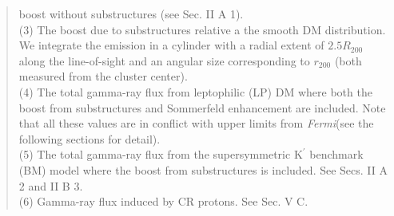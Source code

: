 \documentclass[10pt,aps,pra,reprint,amsmath,amsfonts,amssymb,showpacs,nofootinbib,floatfix]{revtex4-1}
\newcommand{\Fermi}{{\em Fermi}\xspace}
\newcommand{\rmn}{\mathrm}
\newcommand{\Kp}{\rmn{K}^\prime}
\newcommand{\rvir}{r_{200}}
\begin{document}
\begin{table}
\begin{minipage}{2.0\columnwidth}
\begin{quote}
  boost without substructures (see Sec. II A 1).\\
  (3) The boost due to substructures relative a the smooth DM
  distribution. We integrate the emission in a cylinder with a radial
  extent of $2.5 R_{200}$ along the line-of-sight and an angular size
  corresponding to $\rvir$ (both measured from the cluster center).\\
  (4) The total gamma-ray flux from leptophilic (LP) DM where both the
  boost from substructures and Sommerfeld enhancement are
  included. Note that all these values are in conflict with upper limits from
  \Fermi (see the following sections for detail).\\
  (5) The total gamma-ray flux from the supersymmetric $\Kp$ benchmark (BM)
  model where the boost from substructures is included. See Secs. II A 2 and II B 3.\\
  (6) Gamma-ray flux induced by CR protons. See Sec. V C.
 \label{tab:flux_tab}
  \end{quote}
\end{minipage}
\end{table}
\end{document}
